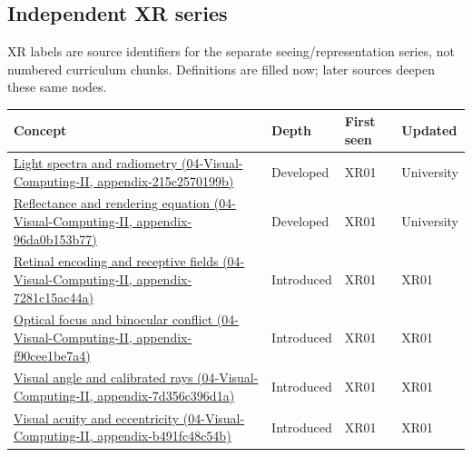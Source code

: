 \subsection{Independent XR series}\label{independent-xr-series}

XR labels are source identifiers for the separate seeing/representation series, not numbered curriculum chunks. Definitions are filled now; later sources deepen these same nodes.

{\def\LTcaptype{none} %
\begin{longtable}[]{@{}
  >{\raggedright\arraybackslash}p{}
  >{\raggedright\arraybackslash}p{}
  >{\raggedright\arraybackslash}p{}
  >{\raggedright\arraybackslash}p{}@{}}
\toprule\noalign{}
\begin{minipage}[b]{\linewidth}\raggedright
Concept
\end{minipage} & \begin{minipage}[b]{\linewidth}\raggedright
Depth
\end{minipage} & \begin{minipage}[b]{\linewidth}\raggedright
First seen
\end{minipage} & \begin{minipage}[b]{\linewidth}\raggedright
Updated
\end{minipage} \\
\midrule\noalign{}
\endhead
\bottomrule\noalign{}
\endlastfoot
\href{}{Light spectra and radiometry (04-Visual-Computing-II, appendix-215c2570199b)} & Developed & XR01 & University \\
\href{}{Reflectance and rendering equation (04-Visual-Computing-II, appendix-96da0b153b77)} & Developed & XR01 & University \\
\href{}{Retinal encoding and receptive fields (04-Visual-Computing-II, appendix-7281c15ac44a)} & Introduced & XR01 & XR01 \\
\href{}{Optical focus and binocular conflict (04-Visual-Computing-II, appendix-f90cee1be7a4)} & Introduced & XR01 & XR01 \\
\href{}{Visual angle and calibrated rays (04-Visual-Computing-II, appendix-7d356c396d1a)} & Introduced & XR01 & XR01 \\
\href{}{Visual acuity and eccentricity (04-Visual-Computing-II, appendix-b491fc48c54b)} & Introduced & XR01 & XR01 \\

\end{longtable}}
